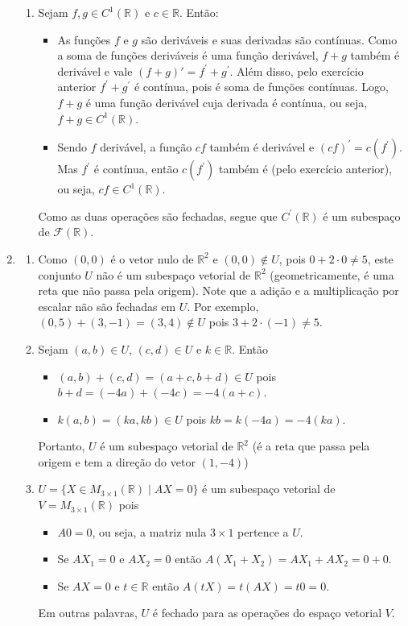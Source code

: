 \documentclass[12pt,a4paper]{article}
\newcommand*\R{\mathbb{R}}
\begin{document}
\begin{enumerate}
\begin{enumerate}
\item Sejam $f,g \in C^1(\R)$ e $c \in \R$. Então:
\begin{itemize}
\item As funções $f$ e $g$ são deriváveis e suas derivadas são contínuas. Como a soma de funções deriváveis é uma função derivável, $f+g$ também é derivável e vale $(f+g)' = f^\prime + g^\prime$. Além disso, pelo exercício anterior $f^\prime+g^\prime$ é contínua, pois é soma de funções contínuas. Logo, $f+g$ é uma função derivável cuja derivada é contínua, ou seja, $f+g \in C^1(\R)$.
\item Sendo $f$ derivável, a função $cf$ também é derivável e $(cf)^\prime = c (f^\prime)$. Mas $f^\prime$ é contínua, então $c (f^\prime)$ também é (pelo exercício anterior), ou seja, $cf \in C^1(\R)$.
\end{itemize}
Como as duas operações são fechadas, segue que $C^\prime(\R)$ é um subespaço de $\mathcal{F}(\R)$.
\end{enumerate}

\item
\begin{enumerate}
\item Como $(0,0)$ é o vetor nulo de $\R^2$ e $(0,0) \not\in U$, pois $0+2\cdot 0 \neq 5$, este conjunto $U$ não é um subespaço vetorial de $\R^2$ (geometricamente, é uma reta que não passa pela origem). Note que a adição e a multiplicação por escalar não são fechadas em $U$. Por exemplo, $(0,5)+(3,-1)=(3,4) \not\in U$ pois $3+2\cdot (-1) \neq 5$.

\item Sejam $(a,b) \in U$, $(c,d) \in U$ e $k \in \R$. Então
\begin{itemize}
\item $(a,b)+(c,d) = (a+c,b+d) \in U$ pois $b+d=(-4a)+(-4c)=-4(a+c)$.
\item $k(a,b) = (ka,kb) \in U$ pois $kb=k(-4a)=-4(ka)$.
\end{itemize}
Portanto, $U$ é um subespaço vetorial de $\R^2$ (é a reta que passa pela origem e tem a direção do vetor $(1,-4)$)

\item $U = \{ X \in M_{3 \times 1}(\R) \mid AX = 0 \}$ é um subespaço vetorial de $V = M_{3 \times 1}(\R)$ pois
\begin{itemize}
\item $A0 = 0$, ou seja, a matriz nula $3 \times 1$ pertence a $U$.
\item Se $AX_1=0$ e $AX_2=0$ então $A(X_1+X_2)=AX_1 + AX_2 = 0 + 0$.
\item Se $AX=0$ e $t \in \R$ então $A(tX)=t(AX) = t0 = 0$.
\end{itemize}
Em outras palavras, $U$ é fechado para as operações do espaço vetorial $V$.


\end{enumerate}
\end{enumerate}
\end{document}
